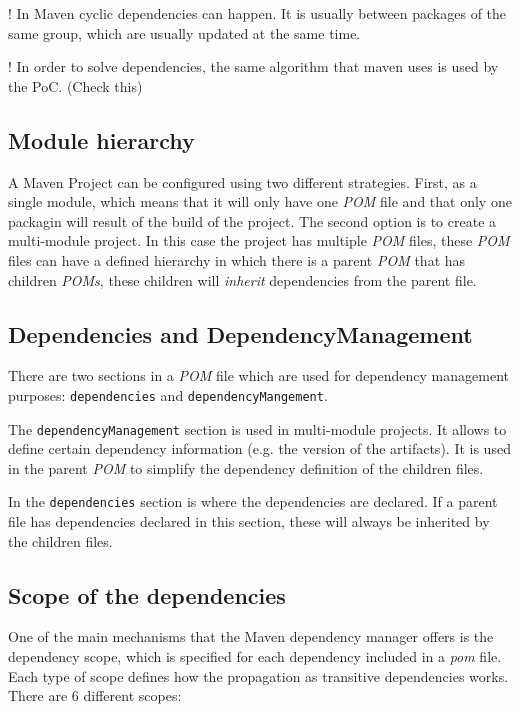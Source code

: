 ! In Maven cyclic dependencies can happen. It is usually between packages of the same group, which are usually updated at the same time.

! In order to solve dependencies, the same algorithm that maven uses is used by the PoC. (Check this)

\subsection{Module hierarchy}
A Maven Project can be configured using two different strategies. First, as a single module, which means that it will only have one \textit{POM} file and that only one packagin will result of the build of the project. The second option is to create a multi-module project. In this case the project has multiple \textit{POM} files, these \textit{POM} files can have a defined hierarchy in which there is a parent \textit{POM} that has children \textit{POMs}, these children will \textit{inherit} dependencies from the parent file.

\subsection{Dependencies and DependencyManagement}
There are two sections in a \textit{POM} file which are used for dependency management purposes: \texttt{dependencies} and \texttt{dependencyMangement}.

The \texttt{dependencyManagement} section is used in multi-module projects. It allows to define certain dependency information (e.g. the version of the artifacts). It is used in the parent \textit{POM} to simplify the dependency definition of the children files.

In the \texttt{dependencies} section is where the dependencies are declared. If a parent file has dependencies declared in this section, these will always be inherited by the children files.

\subsection{Scope of the dependencies}
One of the main mechanisms that the Maven dependency manager offers is the dependency scope, which is specified for each dependency included in a \textit{pom} file. Each type of scope defines how the propagation as transitive dependencies works. There are 6 different scopes:

